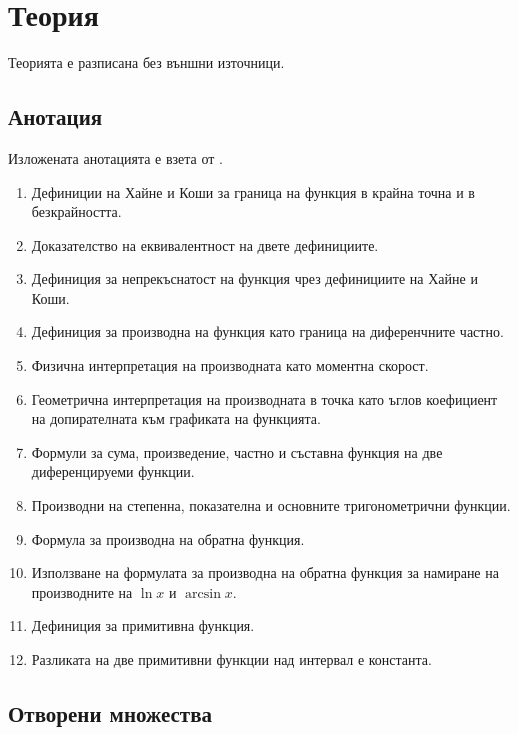 \documentclass{../../common/topic}
\begin{document}
\maketitle

\section{Теория}

Теорията е разписана без външни източници.

\subsection{Анотация}

Изложената анотацията е взета от \cite{Syllabus}.

\begin{enumerate}
  \item Дефиниции на Хайне и Коши за граница на функция в крайна точна и в безкрайността.
  \item Доказателство на еквивалентност на двете дефинициите.
  \item Дефиниция за непрекъснатост на функция чрез дефинициите на Хайне и Коши.
  \item Дефиниция за производна на функция като граница на диференчните частно.
  \item Физична интерпретация на производната като моментна скорост.
  \item Геометрична интерпретация на производната в точка като ъглов коефициент на допирателната към графиката на функцията.
  \item Формули за сума, произведение, частно и съставна функция на две диференцируеми функции.
  \item Производни на степенна, показателна и основните тригонометрични функции.
  \item Формула за производна на обратна функция.
  \item Използване на формулата за производна на обратна функция за намиране на производните на \( \ln x \) и \( \arcsin x \).
  \item Дефиниция за примитивна функция.
  \item Разликата на две примитивни функции над интервал е константа.
\end{enumerate}

\subsection{Отворени множества}
\end{document}
